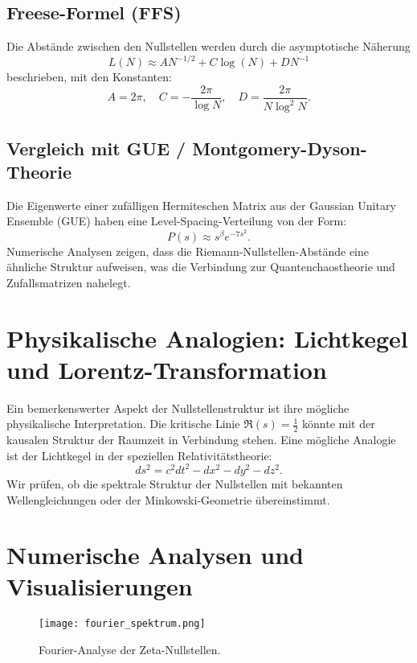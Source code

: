 \documentclass[a4paper,12pt]{article}
\begin{document}
\subsection{Freese-Formel (FFS)}
Die Abstände zwischen den Nullstellen werden durch die asymptotische Näherung
\begin{equation}
L(N) \approx A N^{-1/2} + C \log(N) + D N^{-1}
\end{equation}
beschrieben, mit den Konstanten:
\begin{equation}
A = 2\pi, \quad C = -\frac{2\pi}{\log N}, \quad D = \frac{2\pi}{N \log^2 N}.
\end{equation}

\subsection{Vergleich mit GUE / Montgomery-Dyson-Theorie}
Die Eigenwerte einer zufälligen Hermiteschen Matrix aus der Gaussian Unitary Ensemble (GUE) haben eine Level-Spacing-Verteilung von der Form:
\begin{equation}
P(s) \approx s^\beta e^{-7s^2}.
\end{equation}
Numerische Analysen zeigen, dass die Riemann-Nullstellen-Abstände eine ähnliche Struktur aufweisen, was die Verbindung zur Quantenchaostheorie und Zufallsmatrizen nahelegt.

\section{Physikalische Analogien: Lichtkegel und Lorentz-Transformation}
Ein bemerkenswerter Aspekt der Nullstellenstruktur ist ihre mögliche physikalische Interpretation. Die kritische Linie $\Re(s) = \frac{1}{2}$ könnte mit der kausalen Struktur der Raumzeit in Verbindung stehen. Eine mögliche Analogie ist der Lichtkegel in der speziellen Relativitätstheorie:
\begin{equation}
ds^2 = c^2 dt^2 - dx^2 - dy^2 - dz^2.
\end{equation}
Wir prüfen, ob die spektrale Struktur der Nullstellen mit bekannten Wellengleichungen oder der Minkowski-Geometrie übereinstimmt.

\section{Numerische Analysen und Visualisierungen}
\begin{figure}[h]
    \centering
    \texttt{[image: fourier\_spektrum.png]}
    \caption{Fourier-Analyse der Zeta-Nullstellen.}
    \label{fig:fourier}
\end{figure}
\end{document}
